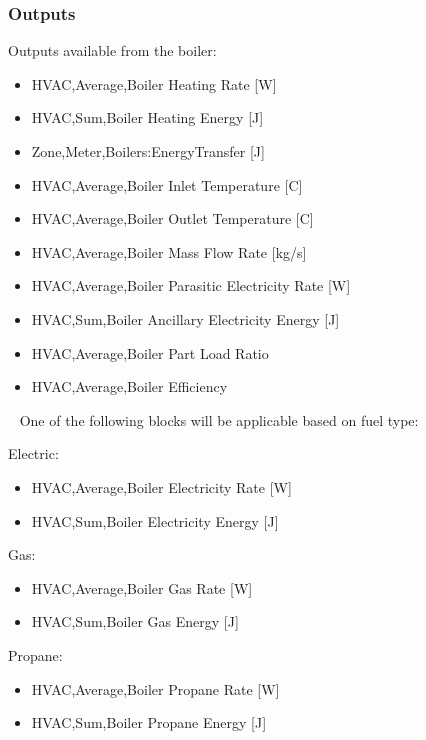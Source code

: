 \subsubsection{Outputs}\label{outputs-10-005}

Outputs available from the boiler:

\begin{itemize}
\item
  HVAC,Average,Boiler Heating Rate {[}W{]}
\item
  HVAC,Sum,Boiler Heating Energy {[}J{]}
\item
  Zone,Meter,Boilers:EnergyTransfer {[}J{]}
\item
  HVAC,Average,Boiler Inlet Temperature {[}C{]}
\item
  HVAC,Average,Boiler Outlet Temperature {[}C{]}
\item
  HVAC,Average,Boiler Mass Flow Rate {[}kg/s{]}
\item
  HVAC,Average,Boiler Parasitic Electricity Rate {[}W{]}
\item
  HVAC,Sum,Boiler Ancillary Electricity Energy {[}J{]}
\item
  HVAC,Average,Boiler Part Load Ratio
\item
  HVAC,Average,Boiler Efficiency
\end{itemize}

~ One of the following blocks will be applicable based on fuel type:

Electric:

\begin{itemize}
\item
  HVAC,Average,Boiler Electricity Rate {[}W{]}
\item
  HVAC,Sum,Boiler Electricity Energy {[}J{]}
\end{itemize}

Gas:

\begin{itemize}
\item
  HVAC,Average,Boiler Gas Rate {[}W{]}
\item
  HVAC,Sum,Boiler Gas Energy {[}J{]}
\end{itemize}

Propane:

\begin{itemize}
\item
  HVAC,Average,Boiler Propane Rate {[}W{]}
\item
  HVAC,Sum,Boiler Propane Energy {[}J{]}
\end{itemize}

